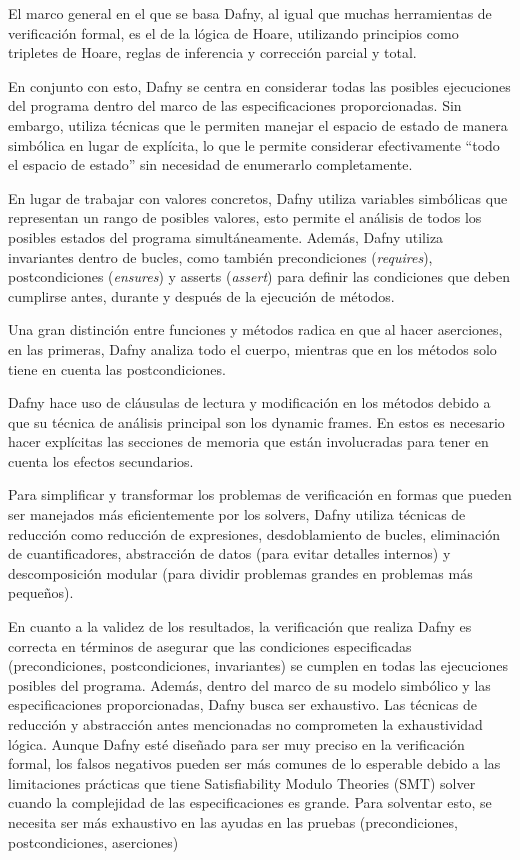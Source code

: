 \documentclass[runningheads]{llncs}
\begin{document}
El marco general en el que se basa Dafny, al igual que muchas herramientas de verificación formal, es el de la lógica de Hoare,
utilizando principios como tripletes de Hoare, reglas de inferencia y corrección parcial y total.

En conjunto con esto, Dafny se centra en considerar todas las posibles ejecuciones del programa dentro del marco de las especificaciones proporcionadas. 
Sin embargo, utiliza técnicas que le permiten manejar el espacio de estado de manera simbólica en lugar de explícita, 
lo que le permite considerar efectivamente ``todo el espacio de estado'' sin necesidad de enumerarlo completamente.

En lugar de trabajar con valores concretos, Dafny utiliza variables simbólicas que representan un rango de posibles valores,
esto permite el análisis de todos los posibles estados del programa simultáneamente.
Además, Dafny utiliza invariantes dentro de bucles, como también precondiciones (\textit{requires}), postcondiciones (\textit{ensures}) y asserts (\textit{assert}) para definir las condiciones 
que deben cumplirse antes, durante y después de la ejecución de métodos.

Una gran distinción entre funciones y métodos radica en que al hacer aserciones, en las primeras, Dafny analiza todo el cuerpo, mientras que en los métodos solo tiene en cuenta las postcondiciones. 

Dafny hace uso de cláusulas de lectura y modificación en los métodos debido a que su técnica de análisis principal son los dynamic frames. En estos es necesario hacer explícitas las secciones de memoria
que están involucradas para tener en cuenta los efectos secundarios.

Para simplificar y transformar los problemas de verificación en formas que pueden ser manejados más eficientemente por los solvers, 
Dafny utiliza técnicas de reducción como reducción de expresiones, desdoblamiento de bucles, eliminación de cuantificadores,
abstracción de datos (para evitar detalles internos) y descomposición modular (para dividir problemas grandes en problemas más pequeños).

En cuanto a la validez de los resultados, la verificación que realiza Dafny es correcta en términos de asegurar que las condiciones
especificadas (precondiciones, postcondiciones, invariantes) se cumplen en todas las ejecuciones posibles del programa. 
Además, dentro del marco de su modelo simbólico y las especificaciones proporcionadas,
Dafny busca ser exhaustivo. Las técnicas de reducción y abstracción antes mencionadas no comprometen la exhaustividad lógica.
Aunque Dafny esté diseñado para ser muy preciso en la verificación formal, 
los falsos negativos pueden ser más comunes de lo esperable debido a las limitaciones prácticas que tiene Satisfiability Modulo Theories (SMT) solver
cuando la complejidad de las especificaciones es grande. Para solventar esto, se necesita ser más exhaustivo en las ayudas en las pruebas (precondiciones, postcondiciones, aserciones)
\end{document}
